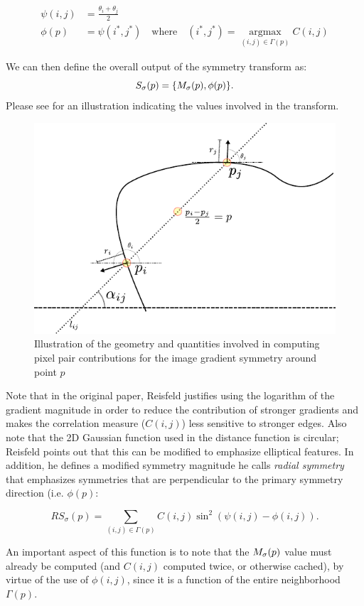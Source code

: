 \begin{align}
\psi(i,j) &= \frac{\theta_i + \theta_j}{2} \\
\phi(p)   &= \psi(i^*,j^*)\quad\mathrm{where}\quad(i^*,j^*) = \operatorname*{argmax}_{(i,j) \in \Gamma(p)} C(i,j)
\end{align} 

We can then define the overall output of the symmetry transform as:
\[S_\sigma(p) = \{M_\sigma(p), \phi(p)\}.\] Please see  for an illustration indicating the values involved in the transform.

\Needspace{0.3\textheight}
\begin{figure}[ht]
\centering
\includegraphics[width=0.6\linewidth]{figures/pixel_contributions.pdf}
\caption{\label{fig:pixel-contr}
Illustration of the geometry and quantities involved in computing pixel pair contributions for the image gradient symmetry around point \(p\)}
\end{figure}

Note that in the original paper, Reisfeld justifies using the logarithm of the gradient magnitude in order to reduce the contribution of stronger gradients and makes the correlation measure (\(C(i,j)\)) less sensitive to stronger edges. Also note that the 2D Gaussian function used in the distance function is circular; Reisfeld points out that this can be modified to emphasize elliptical features. In addition, he defines a modified symmetry magnitude he calls \emph{radial symmetry} that emphasizes symmetries that are perpendicular to the primary symmetry direction (i.e. \(\phi(p)\):

\[ RS_\sigma(p) = \sum_{(i,j) \in \Gamma(p)} C(i,j) \sin^2 \left(\psi(i,j) - \phi(i,j)\right). \] 

An important aspect of this function is to note that the \(M_\sigma(p)\) value must already be computed (and \(C(i,j)\) computed twice, or otherwise cached), by virtue of the use of \(\phi(i,j)\), since it is a function of the entire neighborhood \(\Gamma(p)\).

